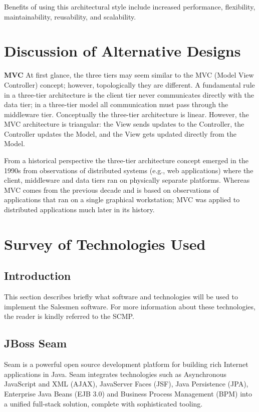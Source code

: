 \documentclass[salesmen, twoside]{../../../templates/latex/2009/softproj}
\begin{document}
\begin{projdoc}
Benefits of using this architectural style include increased performance, flexibility, maintainability, reusability, and scalability.
\section{Discussion of Alternative Designs}
\textbf{MVC}
At first glance, the three tiers may seem similar to the MVC (Model View Controller) concept; however, topologically they are different. A fundamental rule in a three-tier architecture is the client tier never communicates directly with the data tier; in a three-tier model all communication must pass through the middleware tier. Conceptually the three-tier architecture is linear. However, the MVC architecture is triangular: the View sends updates to the Controller, the Controller updates the Model, and the View gets updated directly from the Model.

From a historical perspective the three-tier architecture concept emerged in the 1990s from observations of distributed systems (e.g., web applications) where the client, middleware and data tiers ran on physically separate platforms. Whereas MVC comes from the previous decade and is based on observations of applications that ran on a single graphical workstation; MVC was applied to distributed applications much later in its history.


\section{Survey of Technologies Used}
\subsection{Introduction}
This section describes briefly what software and technologies will be used to implement the Salesmen software. For more information about these technologies, the reader is kindly referred to the SCMP.

\subsection{JBoss Seam}
Seam is a powerful open source development platform for building rich Internet applications in Java. Seam integrates technologies such as Asynchronous JavaScript and XML (AJAX), JavaServer Faces (JSF), Java Persistence (JPA), Enterprise Java Beans (EJB 3.0) and Business Process Management (BPM) into a unified full-stack solution, complete with sophisticated tooling.


\end{projdoc}
\end{document}
